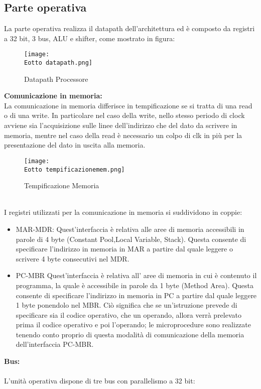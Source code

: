 \documentclass[12pt]{article}
\def \Eotto {Allegati/Esercizio8/}
\begin{document}
\subsection{Parte operativa}
La parte operativa realizza il datapath dell’architettura ed è composto da registri a 32 bit, 3 bus, ALU e shifter, come mostrato in figura:
\begin{figure}[ht!]
    \centering
    \texttt{[image: \\Eotto datapath.png]}
    \caption{Datapath Processore}
\end{figure}
\clearpage
{\large \textbf{Comunicazione in memoria:}}
\\La comunicazione in memoria differisce in tempificazione se si tratta di una read o di una write. In particolare nel caso della write, nello stesso periodo di clock avviene sia l’acquisizione sulle linee dell’indirizzo che del dato da scrivere in memoria, mentre nel caso della read è necessario un colpo di clk in più per la presentazione del dato in uscita alla memoria.
\begin{figure}[ht!]
    \centering
    \texttt{[image: \\Eotto tempificazionemem.png]}
    \caption{Tempificazione Memoria}
\end{figure}
\\I registri utilizzati per la comunicazione in memoria si suddividono in coppie:
\begin{itemize}
    \item MAR-MDR: Quest’interfaccia è relativa alle aree di memoria accessibili in parole di 4 byte (Constant Pool,Local Variable, Stack). Questa consente di specificare l’indirizzo in memoria in MAR a partire dal quale leggere o scrivere 4 byte consecutivi nel MDR.
    \item PC-MBR  Quest’interfaccia è relativa all’ aree di memoria in cui è contenuto il programma, la quale è accessibile in parole da 1 byte (Method Area). Questa consente di specificare l’indirizzo in memoria in PC a partire dal quale leggere 1 byte ponendolo nel MBR. Ciò significa che se un’istruzione prevede di specificare sia il codice operativo, che un operando, allora verrà prelevato prima il codice operativo e poi l’operando; le microprocedure sono realizzate tenendo conto proprio di questa modalità di comunicazione della memoria dell’interfaccia PC-MBR.
\end{itemize}
\clearpage
{\large \textbf{Bus:}}
\\\\L’unità operativa dispone di tre bus con parallelismo a 32 bit:
\end{document}
